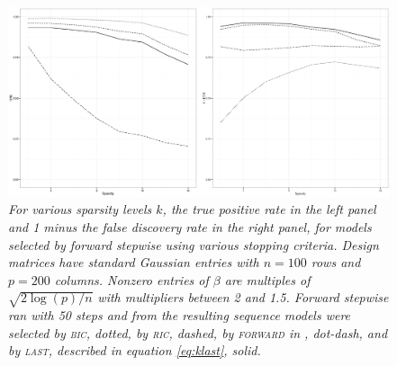\documentclass[oupdraft]{bio}
\def\bic{\textsc{bic}\xspace}
\def\ric{\textsc{ric}\xspace}
\def\forward{\textsc{forward}\xspace}
\def\last{\textsc{last}\xspace}
\begin{document}
\begin{figure}
\begin{center}
\includegraphics[width=\textwidth]{selection_G200_high2.eps}
\caption{\em For various sparsity levels $k$, the true positive rate
  in the left panel and 1 minus the false discovery rate in the right
  panel, for models selected by forward stepwise using various
  stopping criteria. Design matrices have standard Gaussian entries
  with $n = 100$ rows and $p = 200$ columns. Nonzero entries of
  $\beta$ are multiples of $\sqrt{2 \log (p)/n}$ with multipliers
  between 2 and 1.5. Forward stepwise ran with 50 steps and from the
  resulting sequence models were selected by \bic, dotted, by \ric,
  dashed, by \forward in \cite{sequential:fdr}, dot-dash, and by
  \last, described in equation \eqref{eq:klast}, solid.}
\label{fig:selection_sparsity}
\end{center}
\end{figure}
\end{document}
